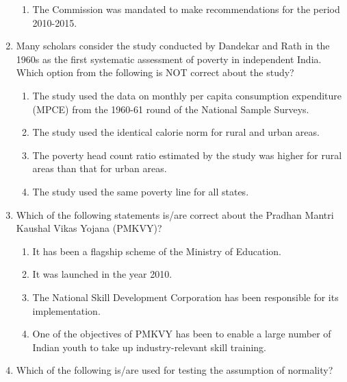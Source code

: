 \documentclass[12pt]{article}
\theoremstyle{remark}
\begin{document}
\begin{enumerate}
\begin{enumerate}
\item  The Commission was mandated to make recommendations for the period 2010-2015. 
\end{enumerate}
\hfill{}
\item  Many scholars consider the study conducted by Dandekar and Rath in the 1960s as the first systematic assessment of poverty in independent India. Which option from the following is NOT correct about the study? 
\begin{enumerate} 
\item  The study used the data on monthly per capita consumption expenditure (MPCE) from the 1960-61 round of the National Sample Surveys. 
\item  The study used the identical calorie norm for rural and urban areas. 
\item  The poverty head count ratio estimated by the study was higher for rural areas than that for urban areas. 
\item  The study used the same poverty line for all states. 
\end{enumerate}
\hfill{}
\item  Which of the following statements is/are correct about the Pradhan Mantri Kaushal Vikas Yojana (PMKVY)? 
\begin{enumerate} 
\item  It has been a flagship scheme of the Ministry of Education. 
\item  It was launched in the year 2010. 
\item  The National Skill Development Corporation has been responsible for its implementation. 
\item  One of the objectives of PMKVY has been to enable a large number of Indian youth to take up industry-relevant skill training. 
\end{enumerate}
\hfill{}
\item Which of the following is/are used for testing the assumption of normality? \\
\begin{enumerate}  \end{enumerate}

\end{enumerate}
\end{document}
